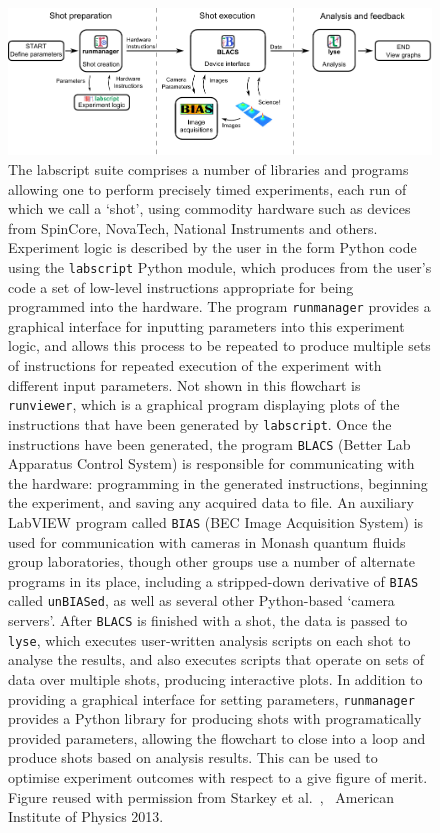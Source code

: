 \begin{figure}
\begin{center}
\includegraphics[width=\textwidth]{figures/software/flow_chart_simple-eps-converted-to.pdf}
\caption{The labscript suite comprises a number of libraries and programs allowing one to perform precisely timed experiments, each run of which we call a `shot', using commodity hardware such as devices from SpinCore, NovaTech, National Instruments and others. Experiment logic is described by the user in the form Python code using the \texttt{labscript} Python module, which produces from the user's code a set of low-level instructions appropriate for being programmed into the hardware. The program \texttt{runmanager} provides a graphical interface for inputting parameters into this experiment logic, and allows this process to be repeated to produce multiple sets of instructions for repeated execution of the experiment with different input parameters. Not shown in this flowchart is \texttt{runviewer}, which is a graphical program displaying plots of the instructions that have been generated by \texttt{labscript}. Once the instructions have been generated, the program \texttt{BLACS} (Better Lab Apparatus Control System) is responsible for communicating with the hardware: programming in the generated instructions, beginning the experiment, and saving any acquired data to file. An auxiliary LabVIEW program called \texttt{BIAS} (BEC Image Acquisition System) is used for communication with cameras in Monash quantum fluids group laboratories, though other groups use a number of alternate programs in its place, including a stripped-down derivative of \texttt{BIAS} called \texttt{unBIASed}, as well as several other Python-based `camera servers'. After \texttt{BLACS} is finished with a shot, the data is passed to \texttt{lyse}, which executes user-written analysis scripts on each shot to analyse the results, and also executes scripts that operate on sets of data over multiple shots, producing interactive plots. In addition to providing a graphical interface for setting parameters, \texttt{runmanager} provides a Python library for producing shots with programatically provided parameters, allowing the flowchart to close into a loop and produce shots based on analysis results. This can be used to optimise experiment outcomes with respect to a give figure of merit. Figure reused with permission from Starkey et al.~\cite{starkey_scripted_2013}, \textcopyright\ American Institute of Physics 2013.}\label{fig:labscript_flowchart}
\end{center}
\end{figure}

